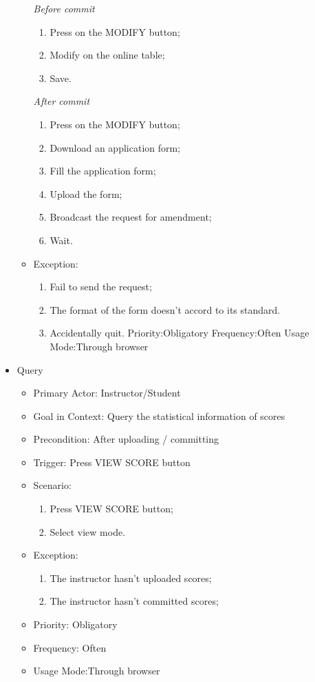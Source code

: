 \documentclass[a4]{article}
\begin{document}
\begin{itemize}
\begin{itemize}
\emph{Before commit}
\begin{enumerate}
\item Press on the MODIFY button;
\item Modify on the online table;
\item Save.
\end{enumerate}
\emph{After commit}
\begin{enumerate}
\item Press on the MODIFY button;
\item Download an application form;
\item Fill the application form;
\item Upload the form;
\item Broadcast the request for amendment;
\item Wait.
\end{enumerate}
\item Exception:
\begin{enumerate}
\item Fail to send the request;
\item The format of the form doesn’t accord to its standard.
\item Accidentally quit.
Priority:Obligatory
Frequency:Often
Usage Mode:Through browser
\end{enumerate}
\end{itemize}

\item Query
\begin{itemize}
\item Primary Actor: Instructor/Student
\item Goal in Context: Query the statistical information of scores
\item Precondition: After uploading / committing
\item Trigger: Press VIEW SCORE button
\item Scenario:
\begin{enumerate}
\item Press VIEW SCORE button;
\item Select view mode.
\end{enumerate}
\item Exception:
\begin{enumerate}
\item The instructor hasn’t uploaded scores;
\item The instructor hasn’t committed scores;
\end{enumerate}

\item Priority: Obligatory
\item Frequency: Often
\item Usage Mode:Through browser
\end{itemize}
\end{itemize}
\end{document}
